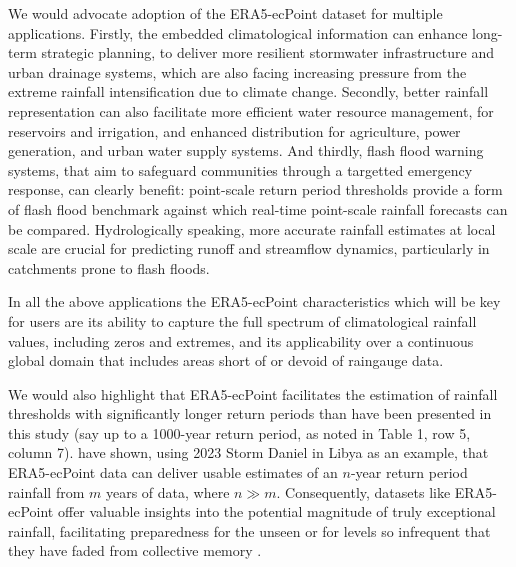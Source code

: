\documentclass{ametsocV6.1}
\begin{document}
We would advocate adoption of the ERA5-ecPoint dataset for multiple applications. Firstly, the embedded climatological information can enhance long-term strategic planning, to deliver more resilient stormwater infrastructure and urban drainage systems, which are also facing increasing pressure from the extreme rainfall intensification due to climate change. Secondly, better rainfall representation can also facilitate more efficient water resource management, for reservoirs and irrigation, and enhanced distribution for agriculture, power generation, and urban water supply systems. And thirdly, flash flood warning systems, that aim to safeguard communities through a targetted emergency response, can clearly benefit: point-scale return period thresholds provide a form of flash flood benchmark against which real-time point-scale rainfall forecasts can be compared. Hydrologically speaking, more accurate rainfall estimates at local scale are crucial for predicting runoff and streamflow dynamics, particularly in catchments prone to flash floods. 

In all the above applications the ERA5-ecPoint characteristics which will be key for users are its ability to capture the full spectrum of climatological rainfall values, including zeros and extremes, and its applicability over a continuous global domain that includes areas short of or devoid of raingauge data.

We would also highlight that ERA5-ecPoint facilitates the estimation of rainfall thresholds with significantly longer return periods than have been presented in this study (say up to a 1000-year return period, as noted in Table 1, row 5, column 7). \cite{Hewson2024_2} have shown, using 2023 Storm Daniel in Libya as an example, that ERA5-ecPoint data can deliver usable estimates of an $n$-year return period rainfall from $m$ years of data, where $n \gg m$. Consequently, datasets like ERA5-ecPoint offer valuable insights into the potential magnitude of truly exceptional rainfall, facilitating preparedness for the unseen \citep{Heinrich2024, Ommer2024} or for levels so infrequent that they have faded from collective memory \citep{Ludwig2023, Merz2024}.
\end{document}
